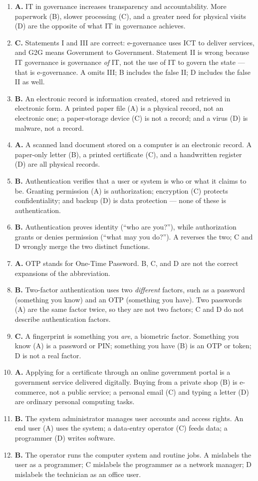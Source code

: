 \documentclass[11pt]{article}
\begin{document}
\begin{enumerate}[label=\textbf{Q\arabic*.}, leftmargin=*]
\item \textbf{A.} IT in governance increases transparency and accountability.
  More paperwork (B), slower processing (C), and a greater need for physical
  visits (D) are the opposite of what IT in governance achieves.
\item \textbf{C.} Statements I and III are correct: e-governance uses ICT to
  deliver services, and G2G means Government to Government. Statement II is
  wrong because IT governance is governance \emph{of} IT, not the use of IT to
  govern the state --- that is e-governance. A omits III; B includes the false
  II; D includes the false II as well.
\item \textbf{B.} An electronic record is information created, stored and
  retrieved in electronic form. A printed paper file (A) is a physical record,
  not an electronic one; a paper-storage device (C) is not a record; and a
  virus (D) is malware, not a record.
\item \textbf{A.} A scanned land document stored on a computer is an
  electronic record. A paper-only letter (B), a printed certificate (C), and a
  handwritten register (D) are all physical records.
\item \textbf{B.} Authentication verifies that a user or system is who or what
  it claims to be. Granting permission (A) is authorization; encryption (C)
  protects confidentiality; and backup (D) is data protection --- none of
  these is authentication.
\item \textbf{B.} Authentication proves identity (``who are you?''), while
  authorization grants or denies permission (``what may you do?''). A reverses
  the two; C and D wrongly merge the two distinct functions.
\item \textbf{A.} OTP stands for One-Time Password. B, C, and D are not the
  correct expansions of the abbreviation.
\item \textbf{B.} Two-factor authentication uses two \emph{different} factors,
  such as a password (something you know) and an OTP (something you have). Two
  passwords (A) are the same factor twice, so they are not two factors; C and
  D do not describe authentication factors.
\item \textbf{C.} A fingerprint is something you \emph{are}, a biometric
  factor. Something you know (A) is a password or PIN; something you have (B)
  is an OTP or token; D is not a real factor.
\item \textbf{A.} Applying for a certificate through an online government
  portal is a government service delivered digitally. Buying from a private
  shop (B) is e-commerce, not a public service; a personal email (C) and
  typing a letter (D) are ordinary personal computing tasks.
\item \textbf{B.} The system administrator manages user accounts and access
  rights. An end user (A) uses the system; a data-entry operator (C) feeds
  data; a programmer (D) writes software.
\item \textbf{B.} The operator runs the computer system and routine jobs. A
  mislabels the user as a programmer; C mislabels the programmer as a network
  manager; D mislabels the technician as an office user.


\end{enumerate}
\end{document}
